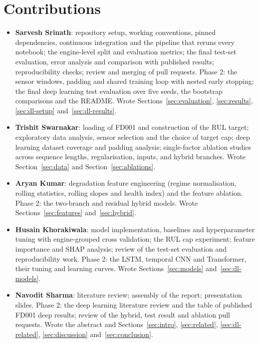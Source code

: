 \section{Contributions}
\label{sec:contributions}

\begin{itemize}
\item \textbf{Sarvesh Srinath}: repository setup, working conventions,
pinned dependencies, continuous integration and the pipeline that reruns
every notebook; the engine-level split and evaluation metrics; the final
test-set evaluation, error analysis and comparison with published results;
reproducibility checks; review and merging of pull requests. Phase 2: the
sensor windows, padding and shared training loop with nested early stopping;
the final deep learning test evaluation over five seeds, the bootstrap
comparisons and the README. Wrote Sections~\ref{sec:evaluation},
\ref{sec:results}, \ref{sec:dl-setup} and~\ref{sec:dl-results}.
\item \textbf{Trishit Swarnakar}: loading of FD001 and construction of the
RUL target; exploratory data analysis, sensor selection and the choice of
target cap; deep learning dataset coverage and padding analysis; single-factor
ablation studies across sequence lengths, regularisation, inputs, and hybrid
branches. Wrote Section~\ref{sec:data} and Section~\ref{sec:ablations}.
\item \textbf{Aryan Kumar}: degradation feature engineering (regime
normalisation, rolling statistics, rolling slopes and health index) and the
feature ablation. Phase 2: the two-branch and residual hybrid models.
Wrote Sections~\ref{sec:features} and~\ref{sec:hybrid}.
\item \textbf{Husain Khorakiwala}: model implementation, baselines and
hyperparameter tuning with engine-grouped cross validation; the RUL cap
experiment; feature importance and SHAP analysis; review of the test-set
evaluation and reproducibility work. Phase 2: the LSTM, temporal CNN and
Transformer, their tuning and learning curves. Wrote
Sections~\ref{sec:models} and~\ref{sec:dl-models}.
\item \textbf{Navodit Sharma}: literature review; assembly of the report;
presentation slides. Phase 2: the deep learning literature review and the
table of published FD001 deep results; review of the hybrid, test result and
ablation pull requests. Wrote the abstract and Sections~\ref{sec:intro},
\ref{sec:related}, \ref{sec:dl-related}, \ref{sec:discussion}
and~\ref{sec:conclusion}.
\end{itemize}
